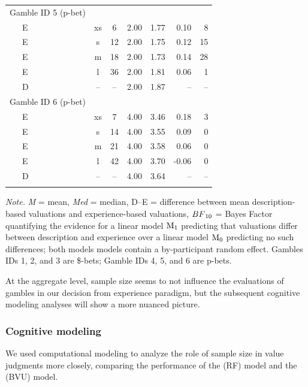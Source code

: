 \documentclass[a4paper, man, floatsintext]{apa6}
\begin{document}
\begin{table}[tbp]
\begin{center}
\begin{threeparttable}
\begin{tabular}{lccccrr}
Gamble ID 5 (p-bet) &  &  &  &  &  & \\
\ \ \ E & xs & 6 & 2.00 & 1.77 & 0.10 & 8\\
\ \ \ E & s & 12 & 2.00 & 1.75 & 0.12 & 15\\
\ \ \ E & m & 18 & 2.00 & 1.73 & 0.14 & 28\\
\ \ \ E & l & 36 & 2.00 & 1.81 & 0.06 & 1\\
\ \ \ D & -- & -- & 2.00 & 1.87 & -- & --\\
Gamble ID 6 (p-bet) &  &  &  &  &  & \\
\ \ \ E & xs & 7 & 4.00 & 3.46 & 0.18 & 3\\
\ \ \ E & s & 14 & 4.00 & 3.55 & 0.09 & 0\\
\ \ \ E & m & 21 & 4.00 & 3.58 & 0.06 & 0\\
\ \ \ E & l & 42 & 4.00 & 3.70 & -0.06 & 0\\
\ \ \ D & -- & -- & 4.00 & 3.64 & -- & --\\
\bottomrule
\addlinespace
\end{tabular}

\begin{tablenotes}[para]
\normalsize{\textit{Note.} \textit{M} = mean, \textit{Med} = median, D--E = difference between mean description-based valuations and experience-based valuations, $BF\textsubscript{10}$ = Bayes Factor quantifying the evidence for a linear model $\mathrm{M}\textsubscript{1}$ predicting that valuations differ between description and experience over a linear model $\mathrm{M}\textsubscript{0}$ predicting no such differences; both models models contain a by-participant random effect. Gambles IDs 1, 2, and 3 are \$-bets; Gamble IDs 4, 5, and 6 are p-bets.}
\end{tablenotes}

\end{threeparttable}
\end{center}

\end{table}

At the aggregate level, sample size seems to not influence the
evaluations of gambles in our decision from experience paradigm, but the
subsequent cognitive modeling analyses will show a more nuanced picture.

\subsubsection{Cognitive modeling}

We used computational modeling to analyze the role of sample size in
value judgments more closely, comparing the performance of the
 (RF) model and the
 (BVU) model.
\end{document}
